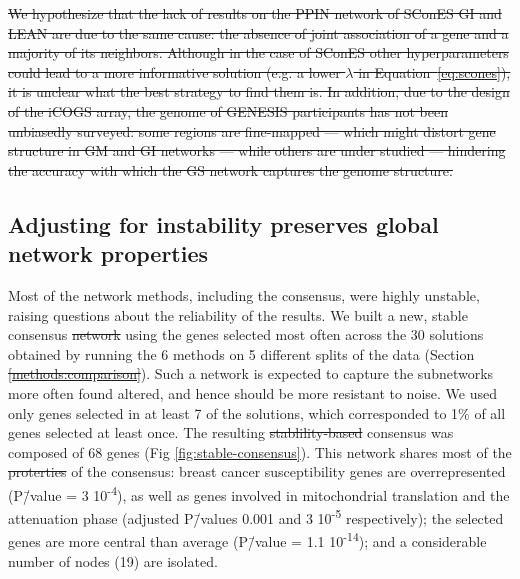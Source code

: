 \documentclass[10pt,letterpaper]{article}
\providecommand{\DIFaddtex}[1]{{\protect\color{blue}\uwave{#1}}} %
\providecommand{\DIFdeltex}[1]{{\protect\color{red}\sout{#1}}}                      %
\providecommand{\DIFaddbegin}{} %
\providecommand{\DIFaddend}{} %
\providecommand{\DIFdelbegin}{} %
\providecommand{\DIFdelend}{} %
\providecommand{\DIFadd}[1]{\texorpdfstring{\DIFaddtex{#1}}{#1}} %
\providecommand{\DIFdel}[1]{\texorpdfstring{\DIFdeltex{#1}}{}} %
\newcommand{\DIFscaledelfig}{0.5}
\newlength{\DIFdelgraphicswidth} %
\newlength{\DIFdelgraphicsheight} %
\newcommand{\DIFaddincludegraphics}[2][]{{\color{blue}\fbox{\DIFOincludegraphics[#1]{#2}}}} %
\newcommand{\DIFdelincludegraphics}[2][]{%
\sbox{\DIFdelgraphicsbox}{\DIFOincludegraphics[#1]{#2}}%
\settoboxwidth{\DIFdelgraphicswidth}{\DIFdelgraphicsbox} %
\settoboxtotalheight{\DIFdelgraphicsheight}{\DIFdelgraphicsbox} %
\scalebox{\DIFscaledelfig}{%
\parbox[b]{\DIFdelgraphicswidth}{\usebox{\DIFdelgraphicsbox}\\[-\baselineskip] \rule{\DIFdelgraphicswidth}{0em}}\llap{\resizebox{\DIFdelgraphicswidth}{\DIFdelgraphicsheight}{%
\setlength{\unitlength}{\DIFdelgraphicswidth}%
\begin{picture}(1,1)%
\thicklines\linethickness{2pt} %
{\color[rgb]{1,0,0}\put(0,0){\framebox(1,1){}}}%
{\color[rgb]{1,0,0}\put(0,0){\line( 1,1){1}}}%
{\color[rgb]{1,0,0}\put(0,1){\line(1,-1){1}}}%
\end{picture}%
}\hspace*{3pt}}} %
} %
\DeclareRobustCommand{\DIFaddbegin}{\DIFOaddbegin \let\includegraphics\DIFaddincludegraphics} %
\DeclareRobustCommand{\DIFaddend}{\DIFOaddend \let\includegraphics\DIFOincludegraphics} %
\DeclareRobustCommand{\DIFdelbegin}{\DIFOdelbegin \let\includegraphics\DIFdelincludegraphics} %
\DeclareRobustCommand{\DIFdelend}{\DIFOaddend \let\includegraphics\DIFOincludegraphics} %
\begin{document}
\DIFdelbegin \DIFdel{We hypothesize that the lack of results on the PPIN network of SConES GI and LEAN are due to the same cause: the absence of joint association of a gene and a majority of its neighbors. Although in the case of SConES other hyperparameters could lead to a more informative solution (e.g. a lower \(\lambda\) in Equation~\ref{eq:scones}), it is unclear what the best strategy to find them is. In addition, due to the design of the iCOGS array, the genome of GENESIS participants has not been unbiasedly surveyed: some regions are fine-mapped --- which might distort gene structure in GM and GI networks --- while others are under studied --- hindering the accuracy with which the GS network captures the genome structure.}\DIFdelend 

 
\subsection{Adjusting for instability preserves global network properties}
\label{results:stable-consensus}

Most of the network methods, including the consensus, were highly unstable, raising questions about the reliability of the results. We built a new, stable consensus \DIFdelbegin \DIFdel{network }\DIFdelend \DIFaddbegin \DIFadd{solution }\DIFaddend using the genes selected most often across the 30 solutions obtained by running the 6 methods on 5 different splits of the data (Section \DIFdelbegin \DIFdel{\ref{methods:comparison}}\DIFdelend \DIFaddbegin \DIFadd{\ref{methods:benchmark}}\DIFaddend ). Such a network is expected to capture the subnetworks more often found altered, and hence should be more resistant to noise. We used only genes selected in at least 7 of the solutions, which corresponded to 1\% of all genes selected at least once. The resulting \DIFdelbegin \DIFdel{stablility-based }\DIFdelend \DIFaddbegin \DIFadd{stability-based }\DIFaddend consensus was composed of 68 genes (Fig \ref{fig:stable-consensus}). This network shares most of the \DIFdelbegin \DIFdel{proterties }\DIFdelend \DIFaddbegin \DIFadd{properties }\DIFaddend of the consensus: breast cancer susceptibility genes are overrepresented (P\=/value = 3 \texttimes{} 10\textsuperscript{-4}), as well as genes involved in mitochondrial translation and the attenuation phase (adjusted P\=/values 0.001 and 3 \texttimes{} 10\textsuperscript{-5} respectively); the selected genes are more central than average (P\=/value = 1.1 \texttimes{} 10\textsuperscript{-14}); and a considerable number of nodes (19) are isolated.
\end{document}
